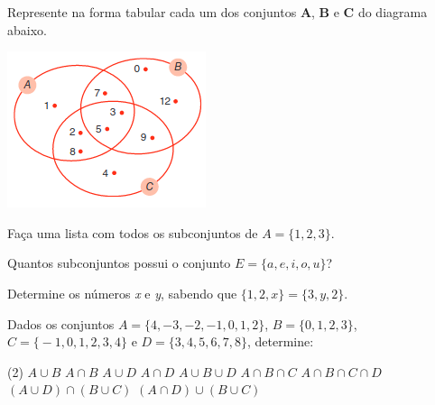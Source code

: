 \documentclass[10pt,a4paper]{article}
\begin{document}



	\begin{multicols}{2}

	  \setlength\columnseprule{0.6pt} %

    \begin{question}[type=exam]
      Represente na forma tabular cada um dos conjuntos \textbf{A}, \textbf{B} e \textbf{C} do diagrama abaixo.
      \begin{Figure}
        \centering
        \includegraphics[scale=1]{figures/q1.png}
      \end{Figure}

    \end{question}
    
    \begin{question}[type=exam]
      Faça uma lista com todos os subconjuntos de $A = \big\{1,2,3\big\}$. 
    \end{question}

    \begin{question}[type=exam]
      Quantos subconjuntos possui o conjunto $E = \big\{a,e,i,o,u\big\}$?
    \end{question}

    \begin{question}[type=exam]
      Determine os números \textit{x} e \textit{y}, sabendo que $\big\{1,2,x\big\} = \big\{3,y,2\big\}$.
    \end{question}

    \begin{question}[type=exam]
      Dados os conjuntos $A = \big\{4,-3,-2,-1,0,1,2\big\}$, $B = \big\{0,1,2,3\big\}$, $C = \big\{-1,0,1,2,3,4\big\}$ e $D = \big\{3,4,5,6,7,8\big\}$, determine:
      \begin{tasks}(2)
        \task $A \cup B$
        \task $A \cap B$
        \task $A \cup D$
        \task $A \cap D$
        \task $A \cup B \cup D$
        \task $A \cap B \cap C$
        \task $A \cap B \cap C \cap D$
        \task $(A \cup D) \cap (B \cup C)$
        \task $(A \cap D) \cup (B \cup C)$
      \end{tasks}
    \end{question}


\end{multicols}
\end{document}
